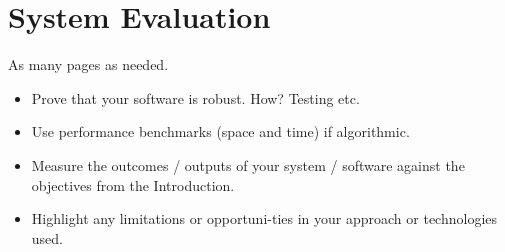 
\chapter{System Evaluation}
As many pages as needed.
\begin{itemize}
\item Prove that your software is robust. How? Testing etc. 
\item Use performance benchmarks (space and time) if algorithmic.
\item Measure the outcomes / outputs of your system / software against the objectives from the Introduction.
\item Highlight any limitations or opportuni-ties in your approach or technologies used.
\end{itemize}